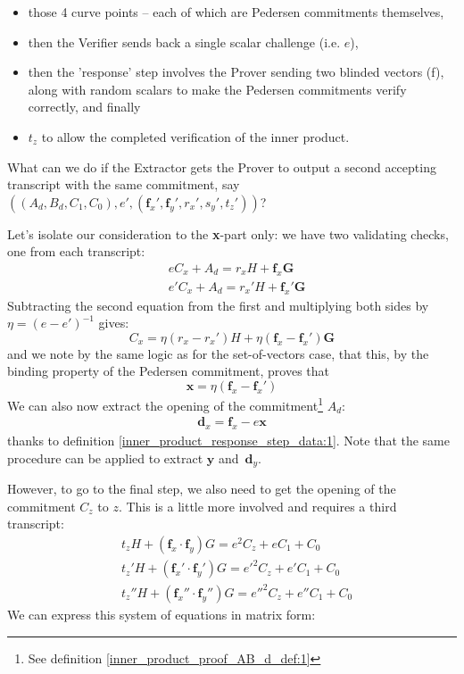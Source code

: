 \documentclass[10pt,a4paper]{article}
\begin{document}
\begin{itemize}
\item those 4 curve points -- each of which are Pedersen commitments themselves,
\item then the Verifier sends back a single scalar challenge (i.e. $e$), 
\item then the 'response' step involves the Prover sending two blinded vectors (f), along with random scalars to
make the Pedersen commitments verify correctly, and finally
\item $t_z$ to allow the completed verification of the inner product.
\end{itemize}

What can we do if the Extractor gets the Prover to output
a second accepting transcript with the same commitment, 
say $\left((A_d, B_d, C_1, C_0), e', (\textbf{f}_x', \textbf{f}_y', r_x', s_y', t_z')\right)$?

Let's isolate our consideration to the \textbf{x}-part only: we have two
validating checks, one from each transcript:
\begin{align*}
& eC_x + A_d = r_xH + \mathbf{f}_x\mathbf{G} \\
& e' C_x + A_d = r_x' H + \mathbf{f}_x' \mathbf{G}
\end{align*}
Subtracting the second equation from the first and multiplying both
sides by $\eta = (e-e')^{-1}$ gives:
\[C_x = \eta (r_x - r_x') H + \eta (\mathbf{f}_x - \mathbf{f}_x' ) \mathbf{G}\]
and we note by the same logic as for the set-of-vectors case, that this,
by the binding property of the Pedersen commitment, proves that
\[\mathbf{x} = \eta (\mathbf{f}_x - \mathbf{f}_x')\]
We can also now extract the opening of 
the commitment\footnote{See definition \eqref{inner_product_proof_AB_d_def:1}} $A_d$: 
\begin{align*}
\mathbf{d}_x = \mathbf{f}_x - e\mathbf{x}
\end{align*}
thanks to definition \eqref{inner_product_response_step_data:1}. 
Note that the same procedure can be applied to extract $\mathbf{y}$ and~$\mathbf{d}_y$.

However, to go to the final step, we also need to get the opening of the
commitment $C_z$ to $z$. This is a little more involved and requires a third
transcript:
\begin{align*}
& t_z H + \left(\textbf{f}_x \cdot \textbf{f}_y \right) G = e^2 C_z + e C_1 + C_0 \\
& t_z' H + \left(\textbf{f}_x' \cdot \textbf{f}_y' \right) G = e'^2 C_z + e' C_1 + C_0 \\
& t_z'' H + \left(\textbf{f}_x'' \cdot \textbf{f}_y'' \right) G = e''^2 C_z + e'' C_1 + C_0
\end{align*}
We can express this system of equations in matrix form:
\end{document}
